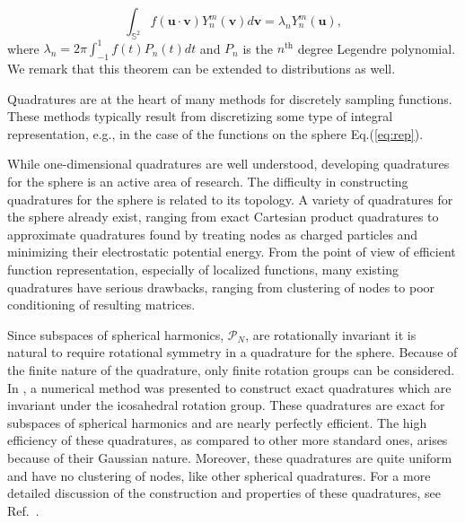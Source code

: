 \documentclass[landscape,a0b,final]{a0poster}
\newcommand{\HH}{{\mathcal P}}
\newenvironment{poster}{
  \begin{center}
  \begin{minipage}[c]{0.98\textwidth}
}{
  \end{minipage} 
  \end{center}
}
\newcommand{\pbox}[4]{
\psshadowbox[#3]{
\begin{minipage}[t][#2][t]{#1}
#4
\end{minipage}
}}
\begin{document}
\begin{poster}
\begin{multicols}{3}
%
\begin{equation}
  \int_{\mathbb{S}^{2}} f\left(\mathbf{u}\cdot\mathbf{v}\right)Y_n^m\left(\mathbf{v}\right)d\mathbf{v} = \lambda_n Y_n^m\left(\mathbf{u}\right),         
  \label{eq:funk-hecke}
\end{equation}
%
where $\lambda_n = 2\pi \int_{-1}^{1} f\left(t\right)P_n\left(t\right)dt$ and $P_n$ is the $n^{\mathrm{th}}$ degree Legendre polynomial. We remark that this theorem can be extended to distributions as well. 
%
\begin{center}\pbox{0.8\columnwidth}{}{linewidth=2mm,framearc=0.1,linecolor=lightblue,fillstyle=gradient,gradangle=0,gradbegin=white,gradend=whiteblue,gradmidpoint=1.0,framesep=1em}{\begin{center}Quadratures for the sphere\end{center}}\end{center}
Quadratures are at the heart of many methods for discretely sampling functions. These methods typically result from 
discretizing some type of integral representation, e.g., in the case of the functions on the sphere Eq.(\ref{eq:rep}). 

While one-dimensional quadratures are well understood, developing quadratures for the sphere is an active area of research. The difficulty in constructing quadratures for the sphere is related to its topology. A variety of quadratures for the sphere already exist, ranging from exact Cartesian product quadratures to approximate quadratures found by treating nodes as charged particles and minimizing their electrostatic potential energy. From the point of view of efficient function representation, especially of localized functions, many existing quadratures have serious drawbacks, ranging from clustering of nodes to poor conditioning of resulting matrices.

Since subspaces of spherical harmonics, $\HH_{N}$, are rotationally invariant it is natural to require rotational symmetry in a quadrature for the sphere. Because of the finite nature of the quadrature, only finite rotation groups can be considered. In \cite{AHR-BEY-2009}, a numerical method was presented to construct exact quadratures which are invariant under the icosahedral rotation group. These quadratures are exact for subspaces of spherical harmonics and are nearly perfectly efficient. The high efficiency of these quadratures, as compared to other more standard ones, arises because of their Gaussian nature. Moreover, these quadratures are quite uniform and have no clustering of nodes, like other spherical quadratures. For a more detailed discussion of the construction and properties of these quadratures, see Ref.~\cite{AHR-BEY-2009}. 


\end{multicols}
\end{poster}
\end{document}
